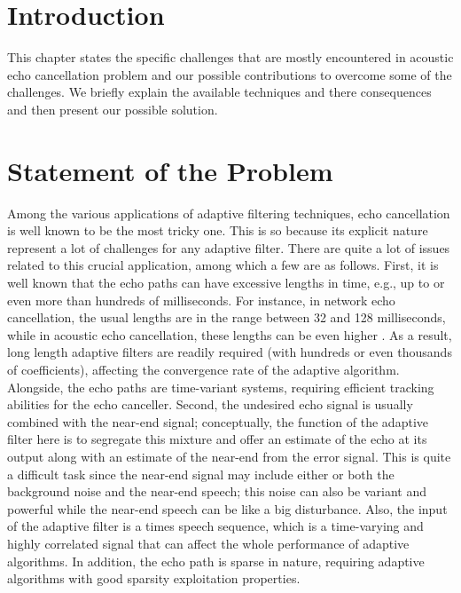 


\section{Introduction}\label{sec:2.1}
\vspace{-0.5cm}
\noindent This chapter states the specific challenges that are mostly encountered in acoustic echo cancellation problem and our possible contributions to overcome some of the challenges. We briefly explain the available techniques and there consequences and then present our possible solution.

\vspace{-0.3cm}
\section{Statement of the Problem}\label{sec:2.2}
\vspace{-0.5cm}
\noindent Among the various applications of adaptive filtering techniques, echo cancellation is well known to be the most tricky one. This is so because its explicit nature represent a lot of challenges for any adaptive filter. There are quite a lot of issues related to this crucial application, among which a few are as follows. First, it is well known that the echo paths can have excessive lengths in time, e.g., up to or even more than hundreds of milliseconds. For instance, in network echo cancellation, the usual lengths are in the range between 32 and 128 milliseconds, while in acoustic echo cancellation, these lengths can be even higher \cite{Duttweiler}. As a result, long length adaptive filters are  readily required (with hundreds or even thousands of coefficients), affecting the convergence rate of the adaptive algorithm. Alongside, the echo paths are time-variant systems, requiring efficient tracking abilities for the echo canceller. Second, the undesired echo signal is usually combined with the near-end signal; conceptually, the function of the adaptive filter here is to
segregate this mixture and offer an estimate of the echo at its output along with an estimate of the near-end from the error signal. This is quite a difficult task since the near-end signal may include either or both the background noise and the near-end speech; this noise can also be variant and powerful while the near-end speech can be like a big disturbance. Also, the input of the adaptive filter is a times speech sequence, which is a time-varying and highly correlated signal that can affect the whole performance of adaptive algorithms. In addition, the echo path is sparse in nature, requiring adaptive algorithms with good sparsity exploitation properties.

